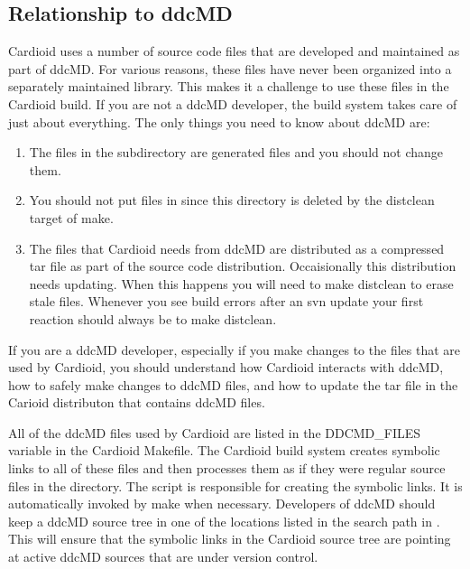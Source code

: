 \documentclass{article}
\begin{document}
\subsection{Relationship to ddcMD}
\label{ssec:ddcMD}

Cardioid uses a number of source code files that are developed and
maintained as part of ddcMD.  For various reasons, these files have
never been organized into a separately maintained library.  This makes
it a challenge to use these files in the Cardioid build.  If you are not
a ddcMD developer, the build system takes care of just about everything.
The only things you need to know about ddcMD are:
\begin{enumerate}
\item The files in the  subdirectory are generated
  files and you should not change them.  
\item You should not put files in  since this
  directory is deleted by the distclean target of make.
\item The files that Cardioid needs from ddcMD are distributed as a
  compressed tar file as part of the source code distribution.
  Occaisionally this distribution needs updating.  When this happens you
  will need to make distclean to erase stale files.  Whenever you see
  build errors after an svn update your first reaction should always be
  to make distclean.
\end{enumerate}

If you are a ddcMD developer, especially if you make changes to the
files that are used by Cardioid, you should understand how Cardioid
interacts with ddcMD, how to safely make changes to ddcMD files, and how
to update the tar file in the Carioid distributon that contains ddcMD
files.

All of the ddcMD files used by Cardioid are listed in the DDCMD\_FILES
variable in the Cardioid Makefile.  The Cardioid build system creates
symbolic links to all of these files and then processes them as if they
were regular source files in the  directory.  The script
 is responsible for creating the symbolic links.
It is automatically invoked by make when necessary.  
Developers of ddcMD should keep a ddcMD source tree in one of the
locations listed in the search path in .  This
will ensure that the symbolic links in the Cardioid source tree are
pointing at active ddcMD sources that are under version control.
\end{document}
